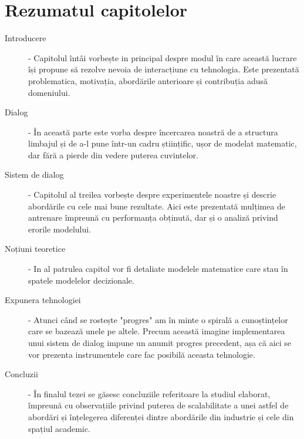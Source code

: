 \section{Rezumatul capitolelor}
\begin{description}
	\item[Introducere]  - 
		Capitolul întâi vorbește in principal despre modul în care această lucrare își propune să rezolve nevoia de interacțiune cu tehnologia. Este prezentată problematica, motivația, abordările anterioare și contribuția adusă domeniului.
	\item[Dialog] -
		În această parte este vorba despre încercarea noastră de a structura limbajul și de a-l pune într-un cadru științific, ușor de modelat matematic, dar fără a pierde din vedere puterea cuvintelor.
	\item[Sistem de dialog] - 
		Capitolul al treilea vorbește despre experimentele noastre și descrie abordările cu cele mai bune rezultate. Aici este prezentată mulțimea de antrenare împreună cu performanța obținută, dar și o analiză privind erorile modelului.
	\item[Noțiuni teoretice] -
		In al patrulea capitol vor fi detaliate modelele matematice care stau în spatele modelelor decizionale.
	\item[Expunera tehnologiei] - 
		Atunci când se rostește "progres" am în minte o  spirală a cunoștințelor care se bazează unele pe altele. Precum această imagine implementarea unui sistem de dialog impune un anumit progres precedent, așa că aici se vor prezenta instrumentele care fac posibilă aceasta tehnologie.
	\item[Concluzii] -
		În finalul tezei se găsesc concluziile referitoare la studiul elaborat, împreună cu observațiile privind puterea de scalabilitate a unei astfel de abordări și înțelegerea diferenței dintre abordările din industrie și cele din spațiul academic.
\end{description}


